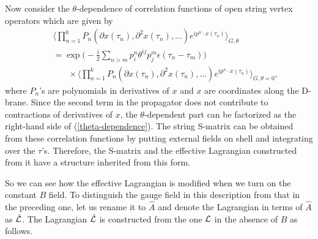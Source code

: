 \documentclass[a4paper,12pt]{article}
\begin{document}
Now consider the $\theta$-dependence of 
correlation functions of open string vertex operators
which are given by
\begin{eqnarray}
&& \Big\langle
\prod_{n=1}^k
P_n ( \partial x (\tau_n), \partial^2 x (\tau_n), \ldots )
e^{i p^n \cdot x (\tau_n)}
\Big\rangle_{G,\theta} \nonumber \\
&& = \exp \Big(
-\frac{i}{2} \sum_{n > m} p^n_i \theta^{ij} p^m_j
\epsilon (\tau_n - \tau_m)
\Big) \nonumber \\
&& ~~~~~~~~ \times \Big\langle
\prod_{n=1}^k
P_n ( \partial x (\tau_n), \partial^2 x (\tau_n), \ldots )
e^{i p^n \cdot x (\tau_n)}
\Big\rangle_{G,\theta=0},
\label{theta-dependence}
\end{eqnarray}
where $P_n$'s are polynomials in derivatives of $x$
and $x$ are coordinates along the D-brane.
Since the second term in the propagator
does not contribute to contractions of derivatives of $x$,
the $\theta$-dependent part can be factorized
as the right-hand side of (\ref{theta-dependence}).
The string S-matrix can be obtained from these correlation
functions by putting external fields on shell
and integrating over the $\tau$'s.
Therefore, the S-matrix and the effective Lagrangian
constructed from it have a structure inherited from this form.

So we can see how the effective Lagrangian is modified
when we turn on the constant $B$ field.
To distinguish the gauge field
in this description from that in the preceding one,
let us rename it to $\hat{A}$
and denote the Lagrangian in terms of $\hat{A}$
as $\hat{{\cal L}}$.
The Lagrangian $\hat{{\cal L}}$ is constructed from
the one ${\cal L}$ in the absence of $B$ as follows.
\end{document}
